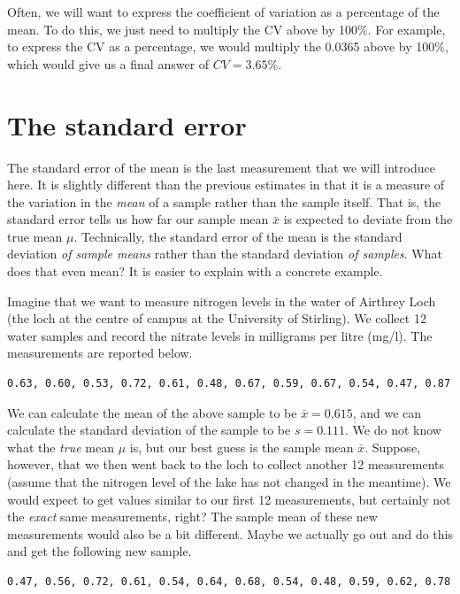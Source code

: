 \documentclass[
]{scrbook}
\begin{document}
Often, we will want to express the coefficient of variation as a percentage of the mean.
To do this, we just need to multiply the CV above by 100\%.
For example, to express the CV as a percentage, we would multiply the 0.0365 above by 100\%, which would give us a final answer of \(CV = 3.65\)\%.

\hypertarget{the-standard-error}{%
\section{The standard error}\label{the-standard-error}}

The standard error of the mean is the last measurement that we will introduce here.
It is slightly different than the previous estimates in that it is a measure of the variation in the \emph{mean} of a sample rather than the sample itself.
That is, the standard error tells us how far our sample mean \(\bar{x}\) is expected to deviate from the true mean \(\mu\).
Technically, the standard error of the mean is the standard deviation \emph{of sample means} rather than the standard deviation \emph{of samples}.
What does that even mean?
It is easier to explain with a concrete example.

Imagine that we want to measure nitrogen levels in the water of Airthrey Loch (the loch at the centre of campus at the University of Stirling).
We collect 12 water samples and record the nitrate levels in milligrams per litre (mg/l).
The measurements are reported below.

\begin{verbatim}
0.63, 0.60, 0.53, 0.72, 0.61, 0.48, 0.67, 0.59, 0.67, 0.54, 0.47, 0.87
\end{verbatim}

We can calculate the mean of the above sample to be \(\bar{x} = 0.615\), and we can calculate the standard deviation of the sample to be \(s = 0.111\).
We do not know what the \emph{true} mean \(\mu\) is, but our best guess is the sample mean \(\bar{x}\).
Suppose, however, that we then went back to the loch to collect another 12 measurements (assume that the nitrogen level of the lake has not changed in the meantime).
We would expect to get values similar to our first 12 measurements, but certainly not the \emph{exact} same measurements, right?
The sample mean of these new measurements would also be a bit different.
Maybe we actually go out and do this and get the following new sample.

\begin{verbatim}
0.47, 0.56, 0.72, 0.61, 0.54, 0.64, 0.68, 0.54, 0.48, 0.59, 0.62, 0.78
\end{verbatim}
\end{document}

